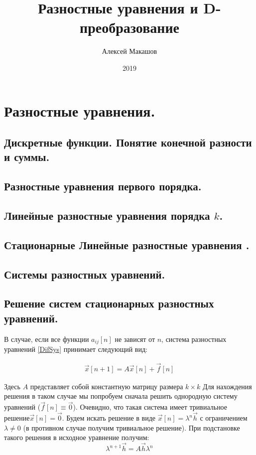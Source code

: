 \documentclass[12pt,twoside]{report}
\title{Разностные уравнения и D-преобразование}
\author{Алексей Макашов}
\date{2019}
\theoremstyle{MyNonumberplain}
\begin{document}
    \maketitle
    \tableofcontents
    \chapter{Разностные уравнения.}
    \section{Дискретные функции. Понятие конечной разности и суммы.}
    \newpage
    \section{Разностные уравнения первого порядка.}
    \newpage
    \section{Линейные разностные уравнения порядка $k$.}
    \newpage
    \section{Стационарные Линейные разностные уравнения .}
    \newpage
    \section{Системы разностных уравнений.}
    \newpage
    \section{Решение систем стационарных разностных уравнений.}

    В случае, если все функции $a_{ij}[n]$ не зависят от $n$, система разностных уравнений \ref{DifSys} принимает следующий вид:

    \begin{eqnarray}\label{statDifSystem}
        \vec{x}[n+1]=A\vec{x}[n]+\vec{f}[n]
    \end{eqnarray}
    
    Здесь $A$ представляет собой константную матрицу размера $k \times k$
    Для нахождения решения в таком случае мы попробуем сначала решить однородную систему уравнений ($\vec{f}[n]\equiv\vec{0}$).
    Очевидно, что такая система имеет тривиальное решение$\vec{x}[n]=\vec{0}$. 
    Будем искать решение в виде $\vec{x}[n]=\lambda^n \vec{h}$ с ограничением $\lambda\neq 0$ 
    (в противном случае получим тривиальное решение). При подстановке такого решения в исходное уравнение получим:
    \begin{equation*}
        \lambda^{n+1}\vec{h} = A\vec{h}\lambda^n 
    \end{equation*}
    
\end{document}
